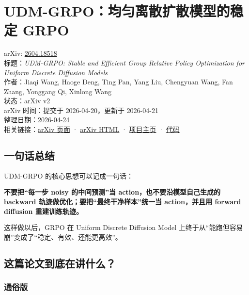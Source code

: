 
\section{UDM-GRPO：均匀离散扩散模型的稳定 GRPO}

\begin{conceptbox}
arXiv: \href{https://arxiv.org/abs/2604.18518}{2604.18518}\\
标题：\textit{UDM-GRPO: Stable and Efficient Group Relative Policy Optimization for Uniform Discrete Diffusion Models}\\
作者：Jiaqi Wang, Haoge Deng, Ting Pan, Yang Liu, Chengyuan Wang, Fan Zhang, Yonggang Qi, Xinlong Wang\\
状态：arXiv v2\\
arXiv 时间：提交于 2026-04-20，更新于 2026-04-21\\
整理日期：2026-04-24\\
相关链接：\href{https://arxiv.org/abs/2604.18518}{arXiv 页面} · \href{https://arxiv.org/html/2604.18518}{arXiv HTML} · \href{https://yovecent.github.io/UDM-GRPO.github.io/}{项目主页} · \href{https://github.com/Yovecent/UDM-GRPO}{代码}
\end{conceptbox}

\subsection{一句话总结}

UDM-GRPO 的核心思想可以记成一句话：

\textbf{不要把“每一步 noisy 的中间预测”当 action，也不要沿模型自己生成的 backward 轨迹做优化；要把“最终干净样本”统一当 action，并且用 forward diffusion 重建训练轨迹。}

这样做以后，GRPO 在 Uniform Discrete Diffusion Model 上终于从“能跑但容易崩”变成了“稳定、有效、还能更高效”。

\subsection{这篇论文到底在讲什么？}

\subsubsection{通俗版}

